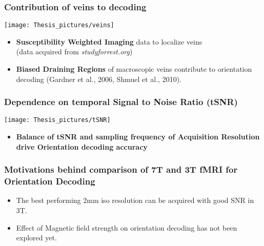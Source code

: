 \documentclass{beamer}
\begin{document}

  \begin{frame}
    \frametitle{Contribution of veins to decoding}
        \begin{center}
            \texttt{[image: Thesis\_pictures/veins]}
        \end{center}
        \begin{itemize}
			\item \textbf{Susceptibility Weighted Imaging} data to localize veins \\(data acquired from \textit{studyforrest.org})
			\item \textbf{Biased Draining Regions} of macroscopic veins 
			contribute to orientation decoding (Gardner et al., 2006, Shmuel et al., 2010).
		\end{itemize}
    \end{frame} 

  \begin{frame}
    \frametitle{Dependence on temporal Signal to Noise Ratio (tSNR)}
        \begin{center}
            \texttt{[image: Thesis\_pictures/tSNR]}
        \end{center}
        \begin{itemize}
			\item \textbf{Balance of tSNR and sampling frequency of 
			Acquisition Resolution drive Orientation decoding accuracy}
		\end{itemize}

    \end{frame} 
    
    



	\begin{frame}
		\frametitle{Motivations behind comparison of 7T and 3T fMRI for Orientation Decoding}
		\begin{itemize}
			\item The best performing 2mm iso resolution can be acquired 
			with good SNR in 3T.
			\item Effect of Magnetic field strength on orientation decoding 
			has not been explored yet.
		\end{itemize}
	\end{frame}	
\end{document}
